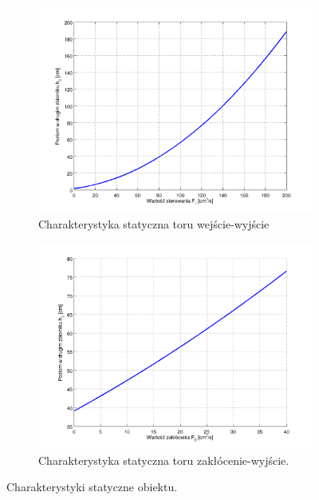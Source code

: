 \documentclass[a4paper,12pt]{article}
\begin{document}
\begin{figure}[h]
   \centering
   \begin{subfigure}[h]{0.45\textwidth}
      \includegraphics[width=\textwidth]{img/char_stat_1.png}
      \caption{Charakterystyka statyczna toru wejście-wyjście}
   \end{subfigure}
   \begin{subfigure}[h]{0.45\textwidth}
      \includegraphics[width=\textwidth]{img/char_stat_2.png}
      \caption{Charakterystyka statyczna toru zakłócenie-wyjście.}
   \end{subfigure}
   \caption{Charakterystyki statyczne obiektu.}
   \label{img:char_stat}
\end{figure}
\end{document}
